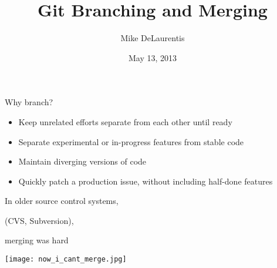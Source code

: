 \documentclass{beamer}
\title{Git Branching and Merging}
\author{Mike DeLaurentis}
\date{May 13, 2013}
\date{}
\begin{document}
\begin{frame}[plain]
\titlepage
\end{frame}

\begin{frame}[plain]
\begin{huge}

Why branch?

\end{huge}
\end{frame}

\begin{frame}[plain]

\begin{LARGE}
\begin{itemize}

\item Keep unrelated efforts separate from each other until ready
\item Separate experimental or in-progress features from stable code
\item Maintain diverging versions of code
\item Quickly patch a production issue, without including half-done features

\end{itemize}
\end{LARGE}
\end{frame}


\begin{frame}[plain]

\begin{center}
\begin{Large}
 In older source control systems,

\vspace{0.2in}

 (CVS, Subversion),

\vspace{0.2in}

 merging was hard
\end{Large}
\end{center}

\end{frame}

\begin{frame}[plain]
  \begin{center}
    \texttt{[image: now\_i\_cant\_merge.jpg]}
  \end{center}
\end{frame}


\end{document}
